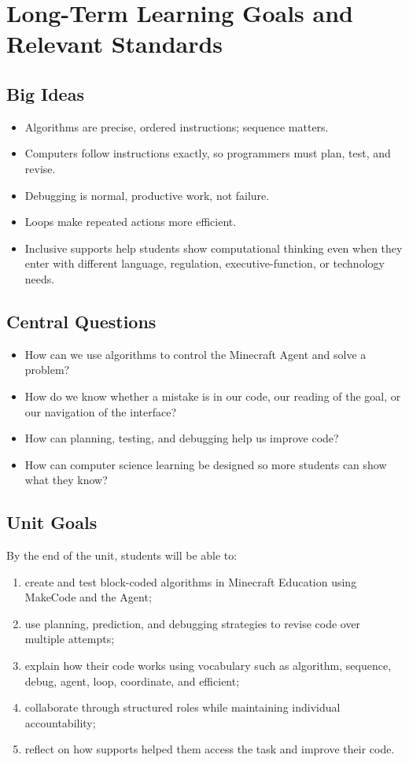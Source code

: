\documentclass[12pt]{article}
\begin{document}
\section{Long-Term Learning Goals and Relevant Standards}
\subsection{Big Ideas}
\begin{itemize}
\item Algorithms are precise, ordered instructions; sequence matters.
\item Computers follow instructions exactly, so programmers must plan, test, and revise.
\item Debugging is normal, productive work, not failure.
\item Loops make repeated actions more efficient.
\item Inclusive supports help students show computational thinking even when they enter with different language, regulation, executive-function, or technology needs.
\end{itemize}

\subsection{Central Questions}
\begin{itemize}
\item How can we use algorithms to control the Minecraft Agent and solve a problem?
\item How do we know whether a mistake is in our code, our reading of the goal, or our navigation of the interface?
\item How can planning, testing, and debugging help us improve code?
\item How can computer science learning be designed so more students can show what they know?
\end{itemize}

\subsection{Unit Goals}
By the end of the unit, students will be able to:
\begin{enumerate}
\item create and test block-coded algorithms in Minecraft Education using MakeCode and the Agent;
\item use planning, prediction, and debugging strategies to revise code over multiple attempts;
\item explain how their code works using vocabulary such as algorithm, sequence, debug, agent, loop, coordinate, and efficient;
\item collaborate through structured roles while maintaining individual accountability;
\item reflect on how supports helped them access the task and improve their code.
\end{enumerate}
\end{document}
